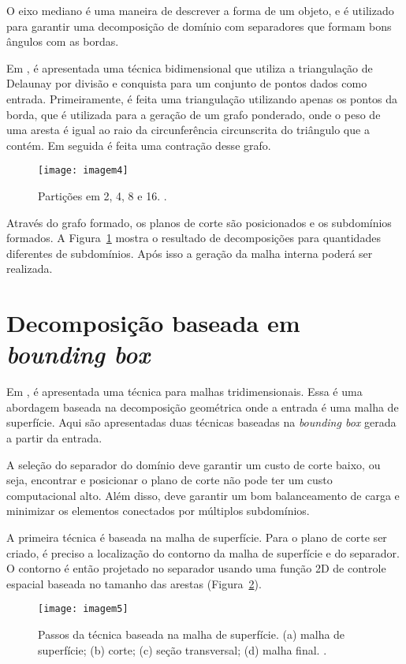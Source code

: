 O eixo mediano é uma maneira de descrever a forma de um objeto, e é utilizado para garantir uma decomposição de domínio com separadores que formam bons ângulos com as bordas.

Em \cite{bib:Leonidas06}, é apresentada uma técnica bidimensional que utiliza a triangulação de Delaunay por divisão e conquista para um conjunto de pontos dados como entrada. Primeiramente, é feita uma triangulação utilizando apenas os pontos da borda, que é utilizada para a geração de um grafo ponderado, onde o peso de uma aresta é igual ao raio da circunferência circunscrita do triângulo que a contém. Em seguida é feita uma contração desse grafo. 

 \begin{figure}[htbp]
     \centering
     \texttt{[image: imagem4]}
     \caption{Partições em 2, 4, 8 e 16. \cite{bib:Leonidas06}.}
     \label{fig:imagem4}
 \end{figure}

Através do grafo formado, os planos de corte são posicionados e os subdomínios formados. A Figura~\ref{fig:imagem4} mostra o resultado de decomposições para quantidades diferentes de subdomínios. Após isso a geração da malha interna poderá ser realizada.

\section{Decomposição baseada em \textit{bounding box}}

Em \cite{bib:Glut08}, é apresentada uma técnica para malhas tridimensionais. Essa é uma abordagem baseada na decomposição geométrica onde a entrada é uma malha de superfície. Aqui são apresentadas duas técnicas baseadas na \textit{bounding box} gerada a partir da entrada.

A seleção do separador do domínio deve garantir um custo de corte baixo, ou seja, encontrar e posicionar o plano de corte não pode ter um custo computacional alto. Além disso, deve garantir um bom balanceamento de carga e minimizar os elementos conectados por múltiplos subdomínios.

A primeira técnica é baseada na malha de superfície. Para o plano de corte ser criado, é preciso a localização do contorno da malha de superfície e do separador. O contorno é então projetado no separador usando uma função 2D de controle espacial baseada no tamanho das arestas (Figura~\ref{fig:imagem5}).

 \begin{figure}[htbp]
     \centering
     \texttt{[image: imagem5]}
     \caption{Passos da técnica baseada na malha de superfície. (a) malha de superfície; (b) corte; (c) seção transversal; (d) malha final. \cite{bib:Glut08}.}
     \label{fig:imagem5}
 \end{figure}

